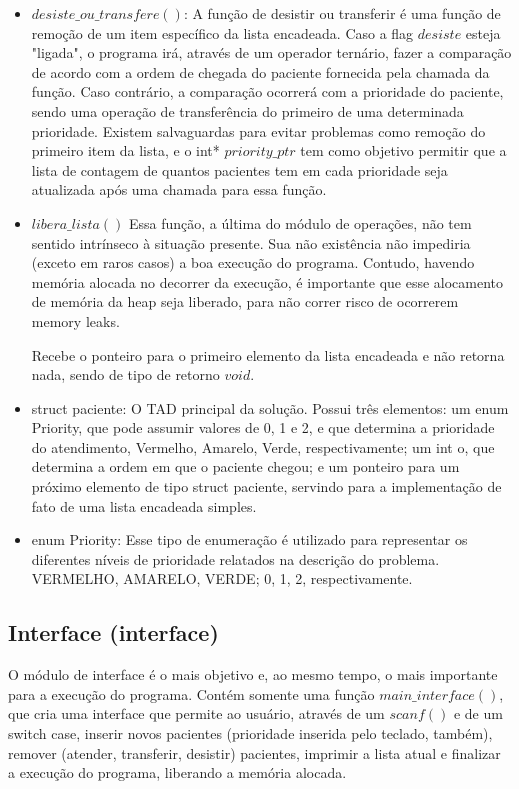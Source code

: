 \documentclass{article}
\begin{document}
\begin{itemize}
\item $desiste\_ou\_transfere()$:
A função de desistir ou transferir é uma função de remoção de um item específico da lista encadeada. Caso a flag $desiste$ esteja "ligada", o programa irá, através de um operador ternário, fazer a comparação de acordo com a ordem de chegada do paciente fornecida pela chamada da função. Caso contrário, a comparação ocorrerá com a prioridade do paciente, sendo uma operação de transferência do primeiro de uma determinada prioridade. Existem salvaguardas para evitar problemas como remoção do primeiro item da lista, e o int* $priority\_ptr$ tem como objetivo permitir que a lista de contagem de quantos pacientes tem em cada prioridade seja atualizada após uma chamada para essa função.

\item $libera\_lista()$
Essa função, a última do módulo de operações, não tem sentido intrínseco à situação presente. Sua não existência não impediria (exceto em raros casos) a boa execução do programa. Contudo, havendo memória alocada no decorrer da execução, é importante que esse alocamento de memória da heap seja liberado, para não correr risco de ocorrerem memory leaks. 

Recebe o ponteiro para o primeiro elemento da lista encadeada e não retorna nada, sendo de tipo de retorno $void$.

\item struct paciente:
O TAD principal da solução. Possui três elementos: um enum Priority, que pode assumir valores de 0, 1 e 2, e que determina a prioridade do atendimento, Vermelho, Amarelo, Verde, respectivamente; um int o, que determina a ordem em que o paciente chegou; e um ponteiro para um próximo elemento de tipo struct paciente, servindo para a implementação de fato de uma lista encadeada simples. 

\item enum Priority:
Esse tipo de enumeração é utilizado para representar os diferentes níveis de prioridade relatados na descrição do problema. VERMELHO, AMARELO, VERDE; 0, 1, 2, respectivamente. 

\end{itemize}

\subsection{Interface (interface)}
O módulo de interface é o mais objetivo e, ao mesmo tempo, o mais importante para a execução do programa. Contém somente uma função $main\_interface()$, que cria uma interface que permite ao usuário, através de um $scanf()$ e de um switch case, inserir novos pacientes (prioridade inserida pelo teclado, também), remover (atender, transferir, desistir) pacientes, imprimir a lista atual e finalizar a execução do programa, liberando a memória alocada.
\end{document}
